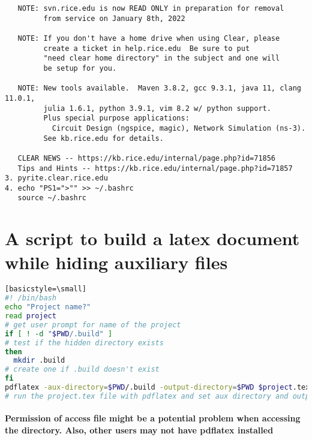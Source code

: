 \documentclass{article}
\begin{document}
\begin{verbatim}
   NOTE: svn.rice.edu is now READ ONLY in preparation for removal
         from service on January 8th, 2022

   NOTE: If you don't have a home drive when using Clear, please
         create a ticket in help.rice.edu  Be sure to put
         "need clear home directory" in the subject and one will
         be setup for you.

   NOTE: New tools available.  Maven 3.8.2, gcc 9.3.1, java 11, clang 11.0.1,
         julia 1.6.1, python 3.9.1, vim 8.2 w/ python support.
         Plus special purpose applications:
           Circuit Design (ngspice, magic), Network Simulation (ns-3).
         See kb.rice.edu for details.

   CLEAR NEWS -- https://kb.rice.edu/internal/page.php?id=71856
   Tips and Hints -- https://kb.rice.edu/internal/page.php?id=71857
3. pyrite.clear.rice.edu
4. echo "PS1=">"" >> ~/.bashrc
   source ~/.bashrc
\end{verbatim}
\section{A script to build a latex document while hiding auxiliary files}
\begin{lstlisting}[language=bash][basicstyle=\small]
#! /bin/bash
echo "Project name?"
read project
# get user prompt for name of the project
if [ ! -d "$PWD/.build" ]
# test if the hidden directory exists
then
  mkdir .build
# create one if .build doesn't exist
fi
pdflatex -aux-directory=$PWD/.build -output-directory=$PWD $project.tex
# run the project.tex file with pdflatex and set aux directory and output directory
\end{lstlisting}
\paragraph{Permission of access file might be a potential problem when accessing the directory. Also, other users may not have pdflatex installed}
\end{document}
